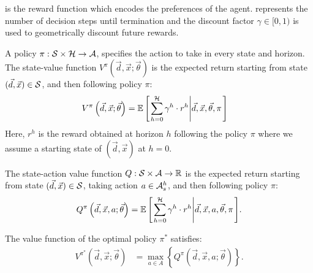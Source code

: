 {\footnotesize \RewardFunc} is the reward function which encodes the preferences of the agent. {\footnotesize \Horizon} represents the number of decision steps until termination and the discount factor {\footnotesize $\gamma \in [0, 1)$} is used to geometrically discount future rewards.

A policy {\footnotesize $\pi : \mathcal{S} \times \mathcal{H} \rightarrow \mathcal{A}$}, specifies the action to take in every state and horizon. The state-value function {\footnotesize $ V^{\pi}(\vec{d}, \vec{x}; \vec{\theta}) $} is the expected return starting from state {\footnotesize $(\vec{d}, \vec{x}) \in \mathcal{S}$}, and then following policy $ \pi $:
{\footnotesize
    \abovedisplayskip=0pt
    \belowdisplayskip=0pt
\begin{align*}
    V^{\pi}\left( \vec{d}, \vec{x}; \vec{\theta} \right) &= {\mathbb{E}\left[{ \left. \sum\limits_{h = 0}^{\mathcal{H}} \gamma^h \cdot r^h \middle| \vec{d}, \vec{x}, \vec{\theta}, \pi \right.}\right]} \nonumber  
\end{align*}
}
Here, {\footnotesize $r^h$} is the reward obtained at horizon $ h $ following the policy $ \pi $ where we assume a starting state of {\footnotesize $ (\vec{d}, \vec{x}) $} at {\footnotesize $ h = 0 $}.

The state-action value function {\footnotesize $Q : \mathcal{S} \times \mathcal{A} \rightarrow \mathbb{R}$} is the expected return starting from state {\footnotesize $(\vec{d}, \vec{x}) \in \mathcal{S}$}, taking action {\footnotesize $ a \in \mathcal{A}^{h}_{s} $}, and then following policy $ \pi $:
{\footnotesize 
    \abovedisplayskip=0pt
    \belowdisplayskip=0pt
\begin{align}
    \label{eq:mdp_qfunc}
    Q^{\pi}\left(\vec{d}, \vec{x}, a; \vec{\theta}\right) = {\mathbb{E}\left[{ \left. \sum\limits_{h = 0}^{\mathcal{H}} \gamma^h \cdot r^h \middle| \vec{d}, \vec{x}, a, \vec{\theta}, \pi \right.}\right]}. 
\end{align}
}

The value function of the optimal policy {\footnotesize$ \pi^{*} $} satisfies:
{\footnotesize 
\abovedisplayskip=0pt
\belowdisplayskip=0pt
\begin{align}
    \label{eq:opt_vfunc}
    V^{\pi^{*}}\left(\vec{d}, \vec{x}; \vec{\theta}\right) &= \max_{a \in A} \left\{ Q^{\pi}\left(\vec{d}, \vec{x}, a; \vec{\theta}\right) \right\}. 
\end{align}
}%

